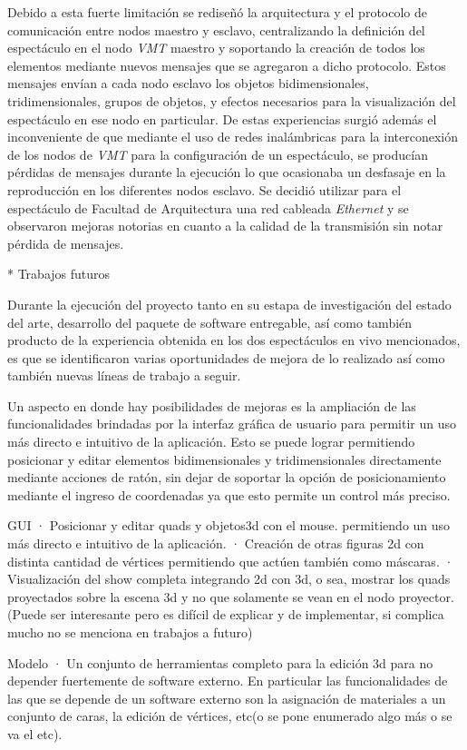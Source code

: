 Debido a esta fuerte limitación se rediseñó la arquitectura y el protocolo de comunicación entre nodos maestro y esclavo, centralizando la definición del espectáculo en el nodo \emph{VMT} maestro y soportando la creación de todos los elementos mediante nuevos mensajes que se agregaron a dicho protocolo. Estos mensajes envían a cada nodo esclavo los objetos bidimensionales, tridimensionales, grupos de objetos, y efectos necesarios para la visualización del espectáculo en ese nodo en particular.
De estas experiencias surgió además el inconveniente de que mediante el uso de redes inalámbricas para la interconexión de los nodos de \emph{VMT} para la configuración de un espectáculo, se producían pérdidas de mensajes durante la ejecución lo que ocasionaba un desfasaje en la reproducción en los diferentes nodos esclavo. Se decidió utilizar para el espectáculo de Facultad de Arquitectura una red cableada \emph{Ethernet} y se observaron mejoras notorias en cuanto a la calidad de la transmisión sin notar pérdida de mensajes.

* Trabajos futuros

Durante la ejecución del proyecto tanto en su estapa de investigación del estado del arte, desarrollo del paquete de software entregable, así como también producto de la experiencia obtenida en los dos espectáculos en vivo mencionados, es que se identificaron varias oportunidades de mejora de lo realizado así como también nuevas líneas de trabajo a seguir.

Un aspecto en donde hay posibilidades de mejoras es la ampliación de las funcionalidades brindadas por la interfaz gráfica de usuario para permitir un uso más directo e intuitivo de la aplicación.
Esto se puede lograr permitiendo posicionar y editar elementos bidimensionales y tridimensionales directamente mediante acciones de ratón, sin dejar de soportar la opción de posicionamiento mediante el ingreso de coordenadas ya que esto permite un control más preciso.

GUI
· Posicionar y editar quads y objetos3d con el mouse. permitiendo un uso más directo e intuitivo de la aplicación.
· Creación de otras figuras 2d con distinta cantidad de vértices permitiendo que actúen también como máscaras.
· Visualización del show completa integrando 2d con 3d, o sea, mostrar los quads proyectados sobre la escena 3d y no que solamente se vean en el nodo proyector. (Puede ser interesante pero es difícil de explicar y de implementar, si complica mucho no se menciona en trabajos a futuro)

Modelo
· Un conjunto de herramientas completo para la edición 3d para no depender fuertemente de software externo. En particular las funcionalidades de las que se depende de un software externo son la asignación de materiales a un conjunto de caras, la edición de vértices, etc(o se pone enumerado algo más o se va el etc).

